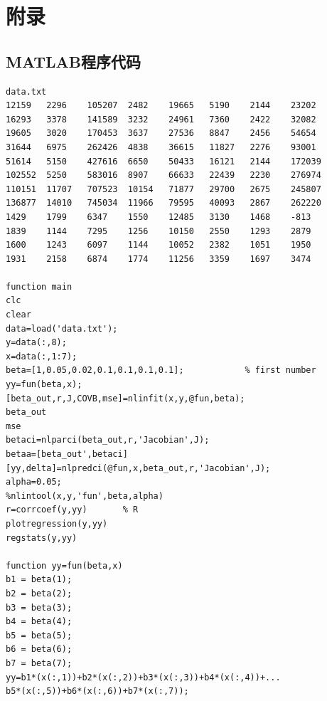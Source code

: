 \documentclass[12pt]{article}%
\begin{document}
\section{附录}
\renewcommand\appendix{\setcounter{secnumdepth}{4}}
\renewcommand\thesubsection{\fontsize{12pt}{1}附录\arabic{subsection}}
\subsection{ MATLAB程序代码}
\begin{lstlisting}
data.txt
12159 	2296 	105207 	2482 	19665 	5190 	2144 	23202 
16293 	3378 	141589 	3232 	24961 	7360 	2422 	32082 
19605 	3020 	170453 	3637 	27536 	8847 	2456 	54654 
31644 	6975 	262426 	4838 	36615 	11827 	2276 	93001 
51614 	5150 	427616 	6650 	50433 	16121 	2144 	172039 
102552 	5250 	583016 	8907 	66633 	22439 	2230 	276974 
110151 	11707 	707523 	10154 	71877 	29700 	2675 	245807 
136877 	14010 	745034 	11966 	79595 	40093 	2867 	262220 
1429 	1799 	6347 	1550 	12485 	3130 	1468 	-813 
1839 	1144 	7295 	1256 	10150 	2550 	1293 	2879 
1600 	1243 	6097 	1144 	10052 	2382 	1051 	1950 
1931 	2158 	6874 	1774 	11256 	3359 	1697 	3474 

function main
clc
clear
data=load('data.txt');
y=data(:,8);
x=data(:,1:7);
beta=[1,0.05,0.02,0.1,0.1,0.1,0.1];            % first number 
yy=fun(beta,x);
[beta_out,r,J,COVB,mse]=nlinfit(x,y,@fun,beta);    
beta_out
mse
betaci=nlparci(beta_out,r,'Jacobian',J);   
betaa=[beta_out',betaci]     
[yy,delta]=nlpredci(@fun,x,beta_out,r,'Jacobian',J); 
alpha=0.05;
%nlintool(x,y,'fun',beta,alpha)  
r=corrcoef(y,yy)       % R
plotregression(y,yy)   
regstats(y,yy)

function yy=fun(beta,x)
b1 = beta(1);
b2 = beta(2);
b3 = beta(3);
b4 = beta(4);
b5 = beta(5);
b6 = beta(6);
b7 = beta(7);
yy=b1*(x(:,1))+b2*(x(:,2))+b3*(x(:,3))+b4*(x(:,4))+...
b5*(x(:,5))+b6*(x(:,6))+b7*(x(:,7));
\end{lstlisting}
\end{document}
